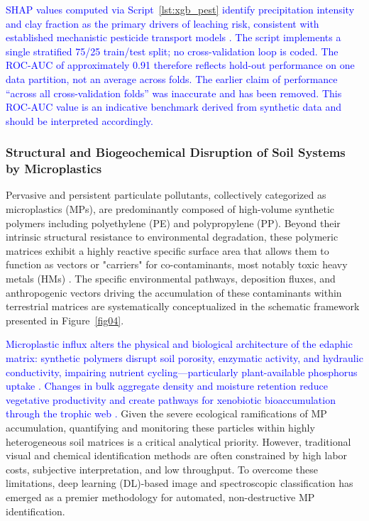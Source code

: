 \documentclass[environments,article,submit,pdftex,moreauthors]{Definitions/mdpi}
\begin{document}
\textcolor{blue}{SHAP values computed via Script~\ref{lst:xgb_pest} identify precipitation intensity and clay fraction as the primary drivers of leaching risk, consistent with established mechanistic pesticide transport models \cite{PerezLucas2025,Marcelino2024}. The script implements a single stratified 75/25 train/test split; no cross-validation loop is coded. The ROC-AUC of approximately 0.91 therefore reflects hold-out performance on one data partition, not an average across folds. The earlier claim of performance ``across all cross-validation folds'' was inaccurate and has been removed. This ROC-AUC value is an indicative benchmark derived from synthetic data and should be interpreted accordingly.}

\subsubsection{Structural and Biogeochemical Disruption of Soil Systems by
    Microplastics}\label{sec2.1.3}

Pervasive and persistent particulate pollutants, collectively categorized as microplastics (MPs), are predominantly composed of high-volume synthetic polymers including polyethylene (PE) and polypropylene (PP). Beyond their intrinsic structural resistance to environmental degradation, these polymeric matrices exhibit a highly reactive specific surface area that allows them to function as vectors or "carriers" for co-contaminants, most notably toxic heavy metals (HMs) \cite{Wang2024a}. The specific environmental pathways, deposition fluxes, and anthropogenic vectors driving the accumulation of these contaminants within terrestrial matrices are systematically conceptualized in the schematic framework presented in Figure~\ref{fig04}.

\textcolor{blue}{Microplastic influx alters the physical and biological architecture of the edaphic matrix: synthetic polymers disrupt soil porosity, enzymatic activity, and hydraulic conductivity, impairing nutrient cycling---particularly plant-available phosphorus uptake \cite{Akdogan2019,Zhou2024,Wang2022}. Changes in bulk aggregate density and moisture retention reduce vegetative productivity and create pathways for xenobiotic bioaccumulation through the trophic web \cite{Jing2023,LindhLemenkova2023d,Chenetal2025}.} Given the severe ecological ramifications of MP accumulation, quantifying and monitoring these particles within highly heterogeneous soil matrices is a critical analytical priority. However, traditional visual and chemical identification methods are often constrained by high labor costs, subjective interpretation, and low throughput. To overcome these limitations, deep learning (DL)-based image and spectroscopic classification has emerged as a premier methodology for automated, non-destructive MP identification. 
\end{document}
